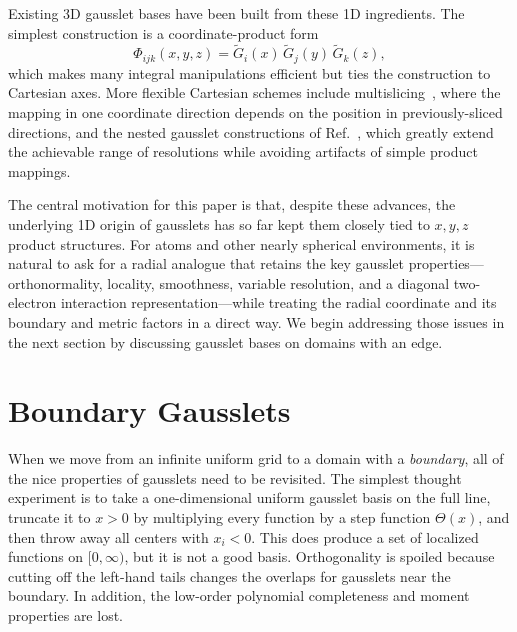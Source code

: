 \documentclass[aps,pra,reprint,longbibliography,nofootinbib]{revtex4-2}
\begin{document}
Existing 3D gausslet bases have been built from these 1D ingredients.  The simplest construction is
a coordinate-product form
\begin{equation}
  \Phi_{ijk}(x,y,z)=\tilde G_i(x)\,\tilde G_j(y)\,\tilde G_k(z),
  \label{eq:product3d}
\end{equation}
which makes many integral manipulations efficient but ties the construction to Cartesian axes.
More flexible Cartesian schemes include multislicing~\cite{WhiteStoudenmire2019MultiSliced}, where the
mapping in one coordinate direction depends on the position in previously-sliced directions, and the
nested gausslet constructions of Ref.~\cite{White2023}, which greatly extend the achievable range of
resolutions while avoiding artifacts of simple product mappings.

The central motivation for this paper is that, despite these advances, the underlying 1D origin of
gausslets has so far kept them closely tied to $x,y,z$ product structures.  For atoms and other
nearly spherical environments, it is natural to ask for a radial analogue that retains the key
gausslet properties---orthonormality, locality, smoothness, variable resolution, and a diagonal
two-electron interaction representation---while treating the radial coordinate and its boundary and
metric factors in a direct way.  We begin addressing those issues in the next section by discussing
gausslet bases on domains with an edge.

   







\section{Boundary Gausslets}
When we move from an infinite uniform grid to a domain with a \emph{boundary}, all of the nice properties of gausslets need to be revisited. The simplest thought experiment is to take a one-dimensional uniform gausslet basis on the full line, truncate it to $x>0$ by multiplying every function by a step function $\Theta(x)$, and then throw away all centers with $x_i<0$. This does produce a set of localized functions on $[0,\infty)$, but it is not a good basis. Orthogonality is spoiled because cutting off the left-hand tails changes the overlaps for gausslets near the boundary. In addition, the low-order polynomial completeness and moment properties are lost. 
\end{document}
